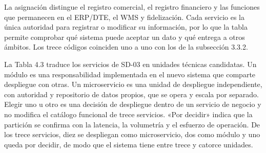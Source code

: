 \documentclass[11pt]{article}
\begin{document}
La asignación distingue el registro comercial, el registro financiero y las funciones que permanecen en el ERP/DTE, el WMS y fidelización. Cada servicio es la única autoridad para registrar o modificar su información, por lo que la tabla permite comprobar qué sistema puede aceptar un dato y qué entrega a otros ámbitos. Los trece códigos coinciden uno a uno con los de la subsección 3.3.2.

La Tabla 4.3 traduce los servicios de SD-03 en unidades técnicas candidatas. Un módulo es una responsabilidad implementada en el nuevo sistema que comparte despliegue con otras. Un microservicio es una unidad de despliegue independiente, con autoridad y repositorio de datos propios, que se opera y escala por separado. Elegir uno u otro es una decisión de despliegue dentro de un servicio de negocio y no modifica el catálogo funcional de trece servicios. «Por decidir» indica que la partición se confirma con la latencia, la volumetría y el esfuerzo de operación. De los trece servicios, diez se despliegan como microservicio, dos como módulo y uno queda por decidir, de modo que el sistema tiene entre trece y catorce unidades.

\par\vspace{0pt plus 10\baselineskip}\vspace{0pt plus -10\baselineskip}
\end{document}
